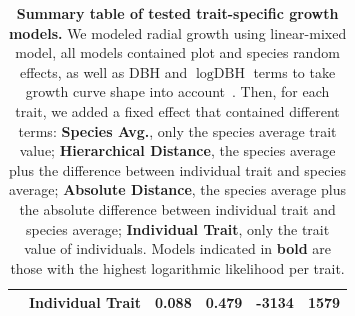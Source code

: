 \begin{table}[!t]
\begin{center}
\begin{tabular}{llcccc}
		            & Individual Trait & 0.088 & 0.479 & -3134 & 1579 \\
		   \hline
		\end{tabular}
		\caption{\textbf{Summary table of tested trait-specific growth models.} We modeled radial growth using linear-mixed model, all models contained plot and species random effects, as well as DBH and $\log\text{DBH}$ terms to take growth curve shape into account~\citep{herault_functional_2011}. Then, for each trait, we added a fixed effect that contained different terms: \textbf{Species Avg.}, only the species average trait value; \textbf{Hierarchical Distance}, the species average plus the difference between individual trait and species average; \textbf{Absolute Distance}, the species average plus the absolute difference between individual trait and species average; \textbf{Individual Trait}, only the trait value of individuals. Models indicated in \textbf{bold} are those with the highest logarithmic likelihood per trait.}
		\label{tab:growth_mod}
	\end{center}
\end{table}

